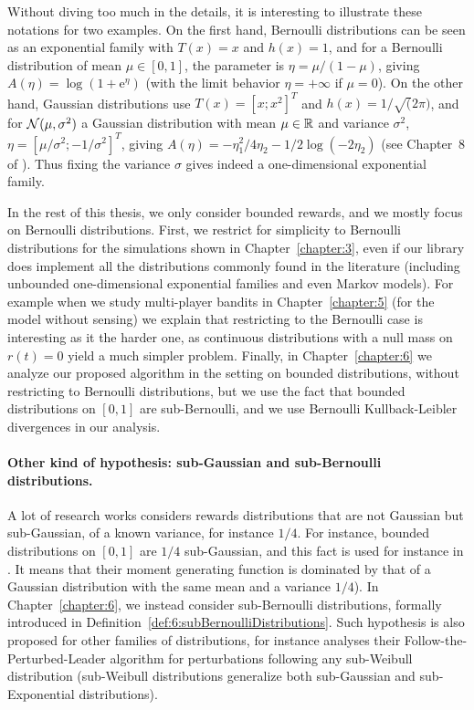 Without diving too much in the details, it is interesting to illustrate these notations for two examples.
On the first hand, Bernoulli distributions can be seen as an exponential family with
$T(x) = x$ and $h(x) = 1$,
and for a Bernoulli distribution of mean $\mu\in[0,1]$,
the parameter is $\eta = \mu / (1 - \mu)$, giving $A(\eta) = \log(1 + \mathrm{e}^{\eta})$
(with the limit behavior $\eta=+\infty$ if $\mu=0$).
%
On the other hand, Gaussian distributions use
$T(x) = [x ; x^2]^T$ and $h(x) = 1/\sqrt(2\pi)$,
and for $\mathcal{N}(\mu,\sigma^2)$ a Gaussian distribution with mean $\mu\in\mathbb{R}$ and variance $\sigma^2$,
$\eta = [\mu/\sigma^2 ; -1/\sigma^2]^T$, giving $A(\eta) = -\eta_1^2/4\eta_2 -1/2 \log(-2\eta_2)$ (see Chapter~8 of \cite{JordanCourseStatBerkeley}).
Thus fixing the variance $\sigma$ gives indeed a one-dimensional exponential family.


In the rest of this thesis, we only consider bounded rewards, and we mostly focus on Bernoulli distributions.
First, we restrict for simplicity to Bernoulli distributions for the simulations shown in Chapter~\ref{chapter:3}, even if our library does implement all the distributions commonly found in the literature (including unbounded one-dimensional exponential families and even Markov models).
%
For example when we study multi-player bandits in Chapter~\ref{chapter:5} (for the model without sensing) we explain that restricting to the Bernoulli case is interesting as it the harder one, as continuous distributions with a null mass on $r(t)=0$ yield a much simpler problem.
%
Finally, in Chapter~\ref{chapter:6} we analyze our proposed algorithm in the setting on bounded distributions, without restricting to Bernoulli distributions, but we use the fact that bounded distributions on $[0,1]$ are sub-Bernoulli, and we use Bernoulli Kullback-Leibler divergences in our analysis.


\paragraph{Other kind of hypothesis: sub-Gaussian and sub-Bernoulli distributions.}
%
A lot of research works considers rewards distributions that are not Gaussian but sub-Gaussian, of a known variance, for instance $1/4$.
For instance, bounded distributions on $[0,1]$ are $1/4$ sub-Gaussian, and this fact is used for instance in \cite{Maillard2018GLR}.
It means that their moment generating function is dominated by that of a Gaussian distribution with the same mean and a variance $1/4$).
In Chapter~\ref{chapter:6}, we instead consider sub-Bernoulli distributions, formally introduced in Definition~\ref{def:6:subBernoulliDistributions}.
%
Such hypothesis is also proposed for other families of distributions, for instance \cite{KimTewari2019} analyses their Follow-the-Perturbed-Leader algorithm for perturbations following any sub-Weibull distribution (sub-Weibull distributions generalize both sub-Gaussian and sub-Exponential distributions).



